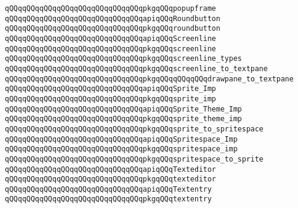 \verb|qQQqqQQqqQQqqQQqqQQqqQQqqQQqqQQqpkgqQQqpopupframe|\newline
\newline
\verb|qQQqqQQqqQQqqQQqqQQqqQQqqQQqqQQqapiqQQqRoundbutton|\newline
\verb|qQQqqQQqqQQqqQQqqQQqqQQqqQQqqQQqpkgqQQqroundbutton|\newline
\newline
\verb|qQQqqQQqqQQqqQQqqQQqqQQqqQQqqQQqapiqQQqScreenline|\newline
\verb|qQQqqQQqqQQqqQQqqQQqqQQqqQQqqQQqpkgqQQqscreenline|\newline
\verb|qQQqqQQqqQQqqQQqqQQqqQQqqQQqqQQqpkgqQQqscreenline_types|\newline
\newline
\verb|qQQqqQQqqQQqqQQqqQQqqQQqqQQqqQQqpkgqQQqscreenline_to_textpane|\newline
\verb|qQQqqQQqqQQqqQQqqQQqqQQqqQQqqQQqpkgqQQqqQQqqQQqdrawpane_to_textpane|\newline
\newline
\verb|qQQqqQQqqQQqqQQqqQQqqQQqqQQqqQQqapiqQQqSprite_Imp|\newline
\verb|qQQqqQQqqQQqqQQqqQQqqQQqqQQqqQQqpkgqQQqsprite_imp|\newline
\newline
\verb|qQQqqQQqqQQqqQQqqQQqqQQqqQQqqQQqapiqQQqSprite_Theme_Imp|\newline
\verb|qQQqqQQqqQQqqQQqqQQqqQQqqQQqqQQqpkgqQQqsprite_theme_imp|\newline
\newline
\verb|qQQqqQQqqQQqqQQqqQQqqQQqqQQqqQQqpkgqQQqsprite_to_spritespace|\newline
\newline
\verb|qQQqqQQqqQQqqQQqqQQqqQQqqQQqqQQqapiqQQqSpritespace_Imp|\newline
\verb|qQQqqQQqqQQqqQQqqQQqqQQqqQQqqQQqpkgqQQqspritespace_imp|\newline
\newline
\verb|qQQqqQQqqQQqqQQqqQQqqQQqqQQqqQQqpkgqQQqspritespace_to_sprite|\newline
\newline
\verb|qQQqqQQqqQQqqQQqqQQqqQQqqQQqqQQqapiqQQqTexteditor|\newline
\verb|qQQqqQQqqQQqqQQqqQQqqQQqqQQqqQQqpkgqQQqtexteditor|\newline
\newline
\verb|qQQqqQQqqQQqqQQqqQQqqQQqqQQqqQQqapiqQQqTextentry|\newline
\verb|qQQqqQQqqQQqqQQqqQQqqQQqqQQqqQQqpkgqQQqtextentry|\newline
